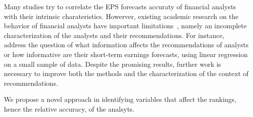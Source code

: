 Many studies try to correlate the EPS forecasts accuraty of financial analysts with their intrinsic charateristics. Howerver, existing academic research on the behavior of financial analysts have important limitations~\citep{clement1999,brown2003,ramnath2008faf}, namely an incomplete characterization of the analysts and their recommendations.  For instance,~\cite{ramnath2008faf} address the question of what information affects the recommendations of analysts or how informative are their short-term earnings forecasts, using linear regression on a small sample of data. Despite the promising results, further work is necessary to improve both the methods and the characterization of the context of recommendations.

We propose a novel approach in identifying variables that affect the rankings, hence the relative accuracy, of the analsyts.




